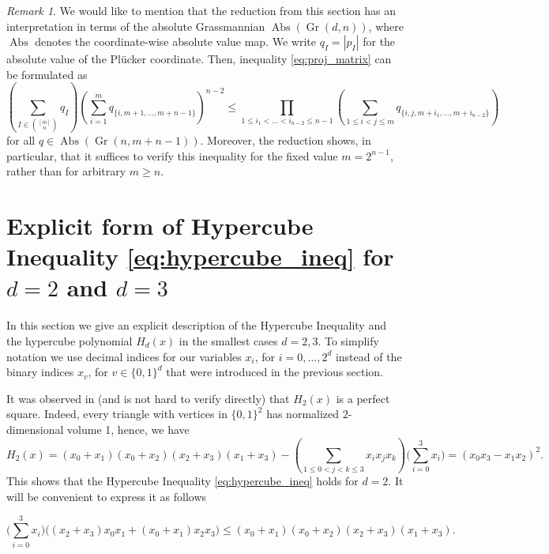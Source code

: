\documentclass[11pt]{amsart}
\theoremstyle{definition}
\theoremstyle{remark}
\newtheorem{rmk}[thm]{Remark}
\begin{document}
\begin{rmk}\label{rem:grassmannian}
We would like to mention that the reduction from this section has an interpretation in terms of the absolute Grassmannian
$\operatorname{Abs}(\operatorname{Gr}(d,n))$, where $\operatorname{Abs}$ denotes the coordinate-wise absolute value map.
We write $q_I=|p_I|$ for the absolute value of the Plücker coordinate.
Then, inequality \eqref{eq:proj_matrix} can be formulated as
\[
\left( \sum_{I \in \binom{[m]}{n}} q_I \right) \left( \sum_{i=1}^m q_{\{i, m+1,\dots, m+n-1\}} \right)^{n-2} \leq \prod_{1 \leq i_1 < \ldots < i_{n-2} \leq n-1}
\left( \sum_{1 \leq i < j \leq m} q_{\{i, j, m+i_1,\dots, m+i_{n-2}\}} \right)
\]
for all $q \in \operatorname{Abs}(\operatorname{Gr}(n,m+n-1))$. 
Moreover, the reduction shows, in particular, that it suffices to verify this inequality for the fixed value $m = 2^{n-1}$, rather than for arbitrary $m \ge n$.
\end{rmk}


\section{Explicit form of Hypercube Inequality \eqref{eq:hypercube_ineq} for $d=2$ and $d=3$}
In this section we give an explicit description of the Hypercube Inequality and the hypercube
polynomial $H_d(x)$ in the smallest cases $d=2,3$. To simplify notation
we use decimal indices for our variables $x_i$, for $i=0,\dots, 2^d$ instead of the binary indices $x_v$, for $v\in\{0,1\}^d$ that were introduced in the previous section.

It was observed in \cite{AS} (and is not hard to verify directly) that $H_2(x)$ is a perfect square.
Indeed, every triangle with vertices in $\{0,1\}^2$ has normalized $2$-dimensional volume 1, hence, we
have
\begin{equation*}\label{eq:HI_d=2}
H_2(x) = (x_0+x_1)(x_0+x_2)(x_2+x_3)(x_1+x_3)-  \left(\sum_{1 \le 0<j<k \le 3} x_i x_j x_k\right)
\Big(\sum_{i=0}^{3} x_i\Big)
= (x_0 x_3 - x_1 x_2)^2. 
\end{equation*}
This shows that the Hypercube Inequality \eqref{eq:hypercube_ineq} holds for $d=2$. It will be convenient to express it as follows

\begin{equation}\label{e:HI_d=2}
\Big(\sum_{i=0}^{3} x_i\Big)\big((x_2+x_3)x_0 x_1 + (x_0+x_1)x_2x_3\big)
\leq
(x_0+x_1)(x_0+x_2)(x_2+x_3)(x_1+x_3). 
\end{equation}
\end{document}
